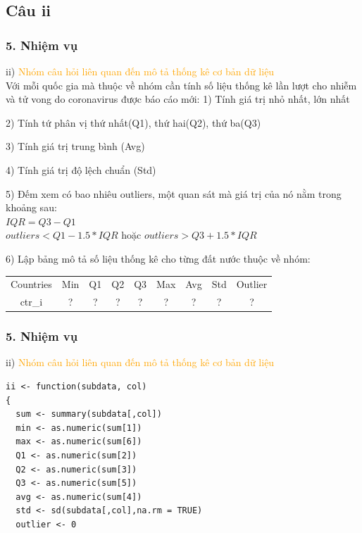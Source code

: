 \documentclass[english,10pt,table]{beamer}
\begin{document}
\subsection{Câu ii}
\begin{frame}[fragile]
\frametitle{5.  Nhiệm vụ}
	ii) \textcolor{orange}{Nhóm câu hỏi liên quan đến mô tả thống kê cơ bản dữ liệu}\\
Với mỗi quốc gia mà thuộc về nhóm cần tính số liệu thống kê lần lượt cho nhiễm và tử vong do coronavirus được báo cáo mới:
    1) Tính giá trị nhỏ nhất, lớn nhất
    
    2) Tính tứ phân vị thứ nhất(Q1), thứ hai(Q2), thứ ba(Q3) 
    
    3) Tính giá trị trung bình (Avg)
    
    4) Tính giá trị độ lệch chuẩn (Std)
    
    5) Đếm xem có bao nhiêu outliers, một quan sát mà giá trị của nó nằm trong khoảng sau:\\
    $IQR = Q3 - Q1$\\
    $outliers < Q1 - 1.5*IQR$ hoặc $outliers > Q3 + 1.5*IQR$
    
    6) Lập bảng mô tả số liệu thống kê cho từng đất nước thuộc về nhóm: \\
\begin{center}
      \begin{tabular}{ c c c c c c c c c}
        Countries & Min & Q1 & Q2 & Q3 & Max & Avg & Std & Outlier \\ 
        ctr\_i & ? & ? & ? & ? & ? & ? & ? & ? \\ 
      \end{tabular}
    \end{center}
\end{frame}

\begin{frame}[fragile]
\frametitle{5.  Nhiệm vụ}
	ii) \textcolor{orange}{Nhóm câu hỏi liên quan đến mô tả thống kê cơ bản dữ liệu}\\
  \begin{lstlisting}[frame=single]
ii <- function(subdata, col)
{
  sum <- summary(subdata[,col])
  min <- as.numeric(sum[1])
  max <- as.numeric(sum[6])
  Q1 <- as.numeric(sum[2])
  Q2 <- as.numeric(sum[3])
  Q3 <- as.numeric(sum[5])
  avg <- as.numeric(sum[4])
  std <- sd(subdata[,col],na.rm = TRUE)
  outlier <- 0
	\end{lstlisting}
\end{frame}
\end{document}
